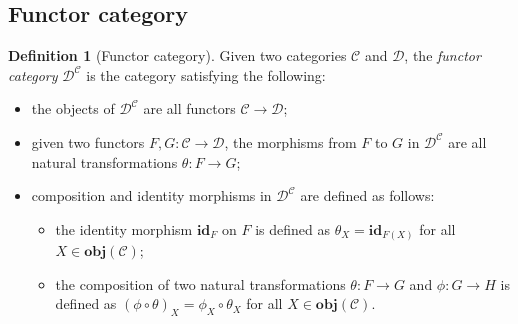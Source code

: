 \documentclass[12pt,twoside,a4paper]{report}
\theoremstyle{definition}
\newtheorem*{definition*}{Definition}
\begin{document}
        \subsection{Functor category}
        \begin{definition*}[Functor category]
            Given two categories $\mathcal{C}$ and $\mathcal{D}$, the \emph{functor category} $\mathcal{D}^{\mathcal{C}}$ is the category satisfying the following:
            \begin{itemize}
                \item 
                    the objects of $\mathcal{D}^{\mathcal{C}}$ are all functors $\mathcal{C} \to \mathcal{D}$;
                \item 
                    given two functors $F,G: \mathcal{C} \to \mathcal{D}$, the morphisms from $F$ to $G$ in $\mathcal{D}^{\mathcal{C}}$ are all natural transformations $\theta : F \to G$;
                \item
                    composition and identity morphisms in $\mathcal{D}^{\mathcal{C}}$ are defined as follows:
                    \begin{itemize}
                        \item 
                            the identity morphism $\textbf{id}_F$ on $F$ is defined as $\theta_X = \textbf{id}_{F(X)}$ for all $X \in \textbf{obj}(\mathcal{C})$;
                        \item
                            the composition of two natural transformations $\theta : F \to G$ and $\phi : G \to H$ is defined as $(\phi \circ \theta)_X = \phi_X \circ \theta_X$ for all $X \in \textbf{obj}(\mathcal{C})$.
                    \end{itemize}
            \end{itemize}
        \end{definition*}
\end{document}
